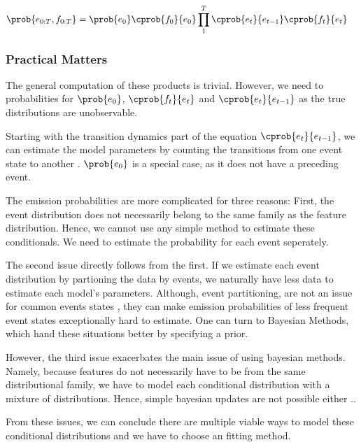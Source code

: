 \documentclass[./../../paper.tex]{subfiles}
\begin{document}
\begin{align}
    \prob{e_{0:T},f_{0:T}} & = \prob{e_0}\cprob{f_0}{e_0}\prod_1^T \cprob{e_t}{e_{t-1}} \cprob{f_t}{e_t}
\end{align}


\subsubsection{Practical Matters}
The general computation of these products is trivial. However, we need to probabilities for $\prob{e_0}$, $\cprob{f_t}{e_t}$ and $\cprob{e_t}{e_{t-1}}$ as the true distributions are unobservable.

Starting with the transition dynamics part of the equation $\cprob{e_t}{e_{t-1}}$, we can estimate the model parameters by counting the transitions from one event state  to another . $\prob{e_0}$ is a special case, as it does not have a preceding event.

The emission probabilities are more complicated for three reasons: First, the event distribution does not necessarily belong to the same family as the feature distribution. Hence, we cannot use any simple method to estimate these conditionals. We need to estimate the probability for each event seperately. 

The second issue directly follows from the first. If we estimate each event distribution by partioning the data by events, we naturally have less data to estimate each model's parameters. Although, event partitioning, are not an issue for common events states , they can make emission probabilities of less frequent event states exceptionally hard to estimate.
One can turn to Bayesian Methods, which hand these situations better by specifying a prior.

However, the third issue exacerbates the main issue of using bayesian methods. Namely, because features do not necessarily have to be from the same distributional family, we have to model each conditional distribution with a mixture of distributions. Hence, simple bayesian updates are not possible either ..

From these issues, we can conclude there are multiple viable ways to model these conditional distributions and we have to choose an fitting method\footnotemark. 
\end{document}
